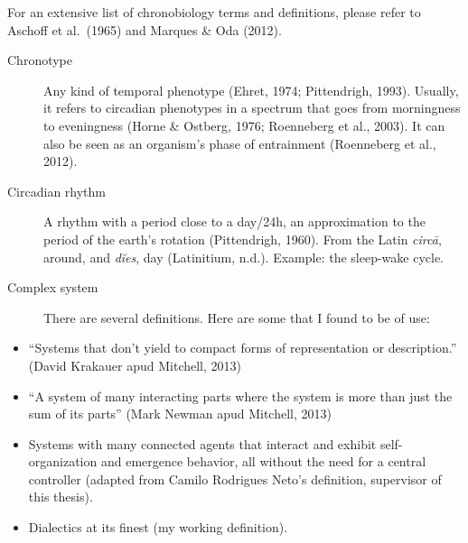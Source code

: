 \documentclass[
  12pt,
  a4paper,
  oneside]{tesesusp}
\providecommand{\tightlist}{%
  \setlength{\itemsep}{0pt}\setlength{\parskip}{0pt}}\usepackage{longtable,booktabs,array}
\begin{document}
\begin{termos}
For an extensive list of chronobiology terms and definitions, please
refer to Aschoff et al.~(1965) and Marques \& Oda (2012).

\begin{description}
\item[Chronotype]
\hspace{20cm}

Any kind of temporal phenotype (Ehret, 1974; Pittendrigh, 1993).
Usually, it refers to circadian phenotypes in a spectrum that goes from
morningness to eveningness (Horne \& Ostberg, 1976; Roenneberg et al.,
2003). It can also be seen as an organism's phase of entrainment
(Roenneberg et al., 2012).
\end{description}

\begin{description}
\item[Circadian rhythm]
\hspace{20cm}

A rhythm with a period close to a day/24h, an approximation to the
period of the earth's rotation (Pittendrigh, 1960). From the Latin
\emph{circā}, around, and \emph{dĭes}, day (Latinitium, n.d.). Example:
the sleep-wake cycle.
\end{description}

\begin{description}
\item[Complex system]
\hspace{20cm}

There are several definitions. Here are some that I found to be of use:
\end{description}

\begin{itemize}
\tightlist
\item
  ``Systems that don't yield to compact forms of representation or
  description.'' (David Krakauer apud Mitchell, 2013)
\item
  ``A system of many interacting parts where the system is more than
  just the sum of its parts'' (Mark Newman apud Mitchell, 2013)
\item
  Systems with many connected agents that interact and exhibit
  self-organization and emergence behavior, all without the need for a
  central controller (adapted from Camilo Rodrigues Neto's definition,
  supervisor of this thesis).
\item
  Dialectics at its finest (my working definition).
\end{itemize}


\end{termos}
\end{document}
